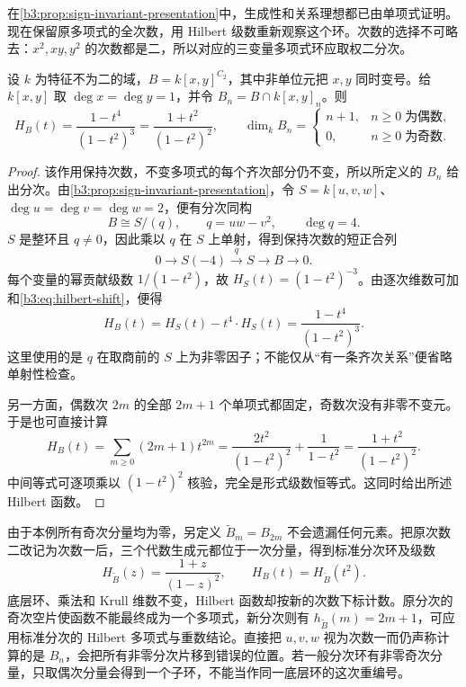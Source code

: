 在\cref{b3:prop:sign-invariant-presentation}中，生成性和关系理想都已由单项式证明。现在保留原多项式的全次数，用 Hilbert 级数重新观察这个环。次数的选择不可略去：\(x^2,xy,y^2\) 的次数都是二，所以对应的三变量多项式环应取权二分次。

\begin{example}\label{b3:exm:sign-invariant-hilbert}
	设 \(k\) 为特征不为二的域，\(B=k[x,y]^{C_2}\)，其中非单位元把 \(x,y\) 同时变号。给 \(k[x,y]\) 取 \(\deg x=\deg y=1\)，并令 \(B_n=B\cap k[x,y]_n\)。则
	\begin{equation}\label{b3:eq:sign-invariant-hilbert}
		H_B(t)=\dfrac{1-t^4}{(1-t^2)^3} =\dfrac{1+t^2}{(1-t^2)^2}, \qquad \dim_k B_n=
		\begin{cases}
			n+1,&n\ge0\;\text{为偶数},\\
			0,&n\ge0\;\text{为奇数}.
		\end{cases}
	\end{equation}
\end{example}
\begin{proof}
	该作用保持次数，不变多项式的每个齐次部分仍不变，所以所定义的 \(B_n\) 给出分次。由\cref{b3:prop:sign-invariant-presentation}，令 \(S=k[u,v,w]\)、\(\deg u=\deg v=\deg w=2\)，便有分次同构
	\[
		B\cong S/(q),\qquad q=uw-v^2,\qquad \deg q=4.
	\]
	\(S\) 是整环且 \(q\ne0\)，因此乘以 \(q\) 在 \(S\) 上单射，得到保持次数的短正合列
	\[
		0\longrightarrow S(-4)\xrightarrow{\ q\ }S \longrightarrow B\longrightarrow0.
	\]
	每个变量的幂贡献级数 \(1/(1-t^2)\)，故 \(H_S(t)=(1-t^2)^{-3}\)。由逐次维数可加和\eqref{b3:eq:hilbert-shift}，便得
	\[
		H_B(t)=H_S(t)-t^4\cdot H_S(t)=\dfrac{1-t^4}{(1-t^2)^3}.
	\]
	这里使用的是 \(q\) 在取商前的 \(S\) 上为非零因子；不能仅从“有一条齐次关系”便省略单射性检查。

	另一方面，偶数次 \(2m\) 的全部 \(2m+1\) 个单项式都固定，奇数次没有非零不变元。于是也可直接计算
	\[
		H_B(t)=\sum_{m\ge0}(2m+1)t^{2m} =\dfrac{2t^2}{(1-t^2)^2}+\dfrac1{1-t^2} =\dfrac{1+t^2}{(1-t^2)^2}.
	\]
	中间等式可逐项乘以 \((1-t^2)^2\) 核验，完全是形式级数恒等式。这同时给出所述 Hilbert 函数。
\end{proof}

由于本例所有奇次分量均为零，另定义 \(\widetilde B_m=B_{2m}\) 不会遗漏任何元素。把原次数二改记为次数一后，三个代数生成元都位于一次分量，得到标准分次环及级数
\[
	H_{\widetilde B}(z)=\dfrac{1+z}{(1-z)^2}, \qquad H_B(t)=H_{\widetilde B}(t^2).
\]
底层环、乘法和 Krull 维数不变，Hilbert 函数却按新的次数下标计数。原分次的奇次空片使函数不能最终成为一个多项式，新分次则有 \(h_{\widetilde B}(m)=2m+1\)，可应用标准分次的 Hilbert 多项式与重数结论。直接把 \(u,v,w\) 视为次数一而仍声称计算的是 \(B_n\)，会把所有非零分次片移到错误的位置。若一般分次环有非零奇次分量，只取偶次分量会得到一个子环，不能当作同一底层环的这次重编号。

